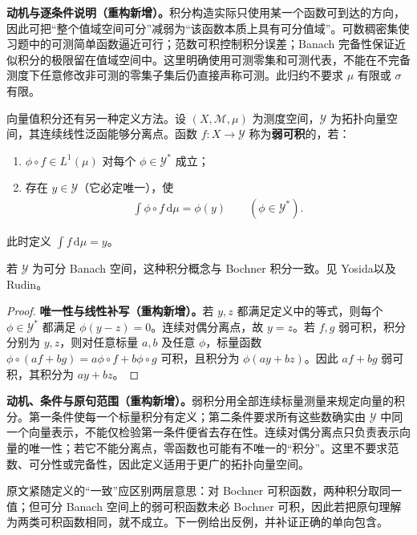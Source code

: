 \documentclass[../../main.tex]{subfiles}
\begin{document}
\begin{remark}
\textbf{动机与逐条件说明（重构新增）。}积分构造实际只使用某一个函数可到达的方向，因此可把“整个值域空间可分”减弱为“该函数本质上具有可分值域”。可数稠密集使习题中的可测简单函数逼近可行；范数可积控制积分误差；Banach 完备性保证近似积分的极限留在值域空间中。这里明确使用可测零集和可测代表，不能在不完备测度下任意修改非可测的零集子集后仍直接声称可测。此归约不要求 $\mu$ 有限或 $\sigma$ 有限。
\end{remark}
\begin{definition}[弱可积与弱积分]\label{definition:ch05-weak-integral}
向量值积分还有另一种定义方法。设 $(X,\mathscr M,\mu)$ 为测度空间，$\mathscr Y$ 为拓扑向量空间，其连续线性泛函能够分离点。函数 $f:X\to\mathscr Y$ 称为\textbf{弱可积}的，若：
\begin{enumerate}
\item $\phi\circ f\in L^1(\mu)$ 对每个 $\phi\in\mathscr Y^*$ 成立；
\item 存在 $y\in\mathscr Y$（它必定唯一），使
\begin{align*}
\int\phi\circ f\,\mathrm d\mu=\phi(y)\qquad(\phi\in\mathscr Y^*).
\end{align*}
\end{enumerate}
此时定义 $\int f\,\mathrm d\mu=y$。
\end{definition}
若 $\mathscr Y$ 为可分 Banach 空间，这种积分概念与 Bochner 积分一致。见 Yosida\cite{folland-bib-163}以及 Rudin\cite{folland-bib-126}。
\begin{proof}
\textbf{唯一性与线性补写（重构新增）。}若 $y,z$ 都满足定义中的等式，则每个 $\phi\in\mathscr Y^*$ 都满足 $\phi(y-z)=0$。连续对偶分离点，故 $y=z$。若 $f,g$ 弱可积，积分分别为 $y,z$，则对任意标量 $a,b$ 及任意 $\phi$，标量函数 $\phi\circ(af+bg)=a\phi\circ f+b\phi\circ g$ 可积，且积分为 $\phi(ay+bz)$。因此 $af+bg$ 弱可积，其积分为 $ay+bz$。
\end{proof}
\begin{remark}
\textbf{动机、条件与原句范围（重构新增）。}弱积分用全部连续标量测量来规定向量的积分。第一条件使每一个标量积分有定义；第二条件要求所有这些数确实由 $\mathscr Y$ 中同一个向量表示，不能仅检验第一条件便省去存在性。连续对偶分离点只负责表示向量的唯一性；若它不能分离点，零函数也可能有不唯一的“积分”。这里不要求范数、可分性或完备性，因此定义适用于更广的拓扑向量空间。

原文紧随定义的“一致”应区别两层意思：对 Bochner 可积函数，两种积分取同一值；但可分 Banach 空间上的弱可积函数未必 Bochner 可积，因此若把原句理解为两类可积函数相同，就不成立。下一例给出反例，并补证正确的单向包含。
\end{remark}
\end{document}
